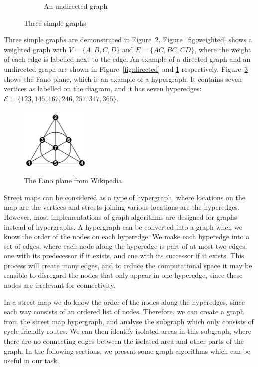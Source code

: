 \documentclass[12pt,a4paper]{report}
\begin{document}
\begin{figure}[ht]
\begin{subfigure}[ht]{0.32\textwidth}
        \caption{An undirected graph}
        \label{fig:undirected}
    \end{subfigure}
       \caption{Three simple graphs}
       \label{fig:three graphs}
\end{figure}

Three simple graphs are demonstrated in Figure~\ref{fig:three graphs}. Figure~\ref{fig:weighted} shows a weighted graph with $V = \{A, B, C, D\}$ and $E = \{AC, BC, CD\}$, where the weight of each edge is labelled next to the edge. An example of a directed graph and an undirected graph are shown in Figure~\ref{fig:directed} and \ref{fig:undirected} respectively. Figure~\ref{fig:fanoplane} shows the Fano plane, which is an example of a hypergraph. It contains seven vertices as labelled on the diagram, and it has seven hyperedges: $\mathcal{E} = \{123, 145, 167, 246, 257, 347, 365\}$.

\begin{figure}[ht]
    \centering
    \includegraphics[width=0.3\textwidth]{diss_images/context/fanoplane.png}
    \caption{The Fano plane from Wikipedia~\cite{WikipediaEN:fanoplane}}
    \label{fig:fanoplane}
\end{figure}

Street maps can be considered as a type of hypergraph, where locations on the map are the vertices and streets joining various locations are the hyperedges. However, most implementations of graph algorithms are designed for graphs instead of hypergraphs. A hypergraph can be converted into a graph when we know the order of the nodes on each hyperedge. We make each hyperedge into a set of edges, where each node along the hyperedge is part of at most two edges: one with its predecessor if it exists, and one with its successor if it exists. This process will create many edges, and to reduce the computational space it may be sensible to disregard the nodes that only appear in one hyperedge, since these nodes are irrelevant for connectivity.

In a street map we do know the order of the nodes along the hyperedges, since each way consists of an ordered list of nodes. Therefore, we can create a graph from the street map hypergraph, and analyse the subgraph which only consists of cycle-friendly routes. We can then identify isolated areas in this subgraph, where there are no connecting edges between the isolated area and other parts of the graph. In the following sections, we present some graph algorithms which can be useful in our task.
\end{document}

